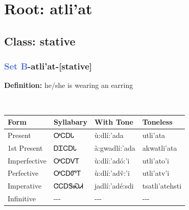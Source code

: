 \needspace{4in}
\section*{Root: atli'at}
\nopagebreak
{}
\needspace{3in}
\subsection*{Class: stative}
\nopagebreak
\needspace{2in}
\subsubsection*{\textcolor{RoyalBlue}{Set B}{-}\textbf{atli'at}{-}[stative]}
\nopagebreak
\textbf{Definition: } he/she is wearing an earring
\\[0.5em]
\begin{tabularx}{\textwidth}{l X X X}%
\toprule%
\textbf{Form}&\textbf{Syllabary}&\textbf{With Tone}&\textbf{Toneless}\\%
\midrule%
Present&ᎤᏟᎠᏓ&ù:dlí:’ada&utli'ata\\%
1st Present&ᎠᏆᏟᎠᏓ&à:gwadlí:’ada&akwatli'ata\\%
Imperfective&ᎤᏟᎠᏙᎢ&ù:dlí:’adó:’i&utli'ato'i\\%
Perfective&ᎤᏟᎠᏛᎢ&ù:dlí:’adv̌:’i&utli'atv'i\\%
Imperative&ᏣᏟᎠᏕᏍᏗ&jadlí:’adé:sdi&tsatli'atehsti\\%
Infinitive&{-}{-}{-}&{-}{-}{-}&{-}{-}{-}\\%
\bottomrule%
\end{tabularx}
\\[1em]